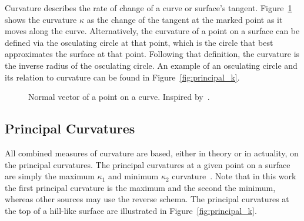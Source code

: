 Curvature describes the rate of change of a curve or surface's tangent.
Figure~\ref{fig:tangent_on_curve} shows the curvature $\kappa$ as the change of the tangent at the marked point as it moves along the curve.
Alternatively, the curvature of a point on a surface can be defined via the osculating circle at that point, which is the circle that best approximates the surface at that point.
Following that definition, the curvature is the inverse radius of the osculating circle.
An example of an osculating circle and its relation to curvature can be found in Figure~\ref{fig:principal_k}.

\begin{figure}[ht]
	\centering
{}
	\caption{%
Normal vector of a point on a curve.
Inspired by~\cite{DDGAppIntro_12_smooth_curves}.}
	\label{fig:tangent_on_curve}
\end{figure}

\subsection{Principal Curvatures}
All combined measures of curvature are based, either in theory or in actuality, on the principal curvatures.
The principal curvatures at a given point on a surface are simply the maximum $\kappa_1$ and minimum $\kappa_2$ curvature~\cite{DDGAppIntro_17_smooth_k}.
Note that in this work the first principal curvature is the maximum and the second the minimum, whereas other sources may use the reverse schema.
The principal curvatures at the top of a hill-like surface are illustrated in Figure~\ref{fig:principal_k}.


